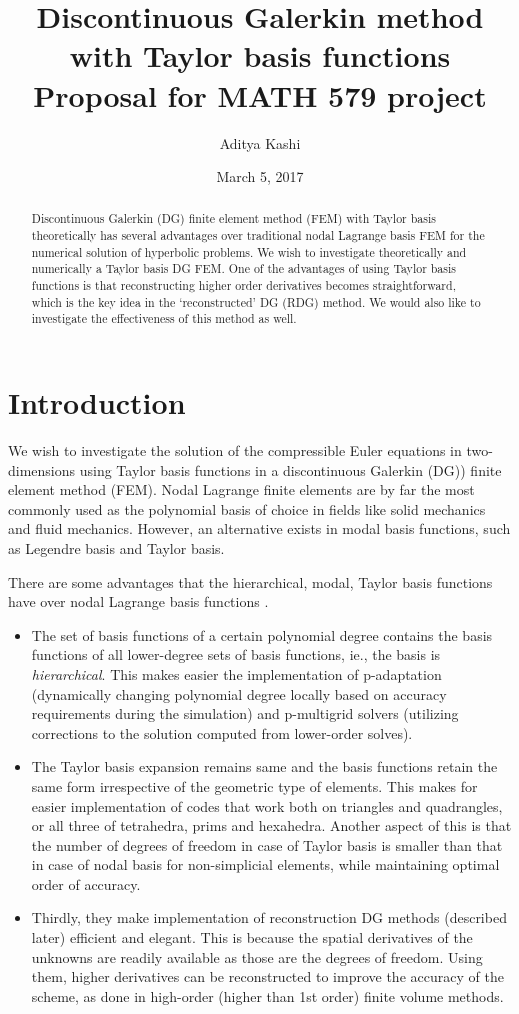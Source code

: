 \documentclass[11pt]{article}
\title{Discontinuous Galerkin method with Taylor basis functions \\
\large Proposal for MATH 579 project}
\author{Aditya Kashi}
\date{March 5, 2017}
\begin{document}
\maketitle
\begin{abstract}
Discontinuous Galerkin (DG) finite element method (FEM) with Taylor basis theoretically has several advantages over traditional nodal Lagrange basis FEM for the numerical solution of hyperbolic problems. We wish to investigate theoretically and numerically a Taylor basis DG FEM. One of the advantages of using Taylor basis functions is that reconstructing higher order derivatives becomes straightforward, which is the key idea in the `reconstructed' DG (RDG) method. We would also like to investigate the effectiveness of this method as well.
\end{abstract}

\section{Introduction}
We wish to investigate the solution of the compressible Euler equations in two-dimensions using Taylor basis functions in a discontinuous Galerkin (DG)) finite element method (FEM). Nodal Lagrange finite elements are by far the most commonly used as the polynomial basis of choice in fields like solid mechanics and fluid mechanics. However, an alternative exists in modal basis functions, such as Legendre basis and Taylor basis.

There are some advantages that the hierarchical, modal, Taylor basis functions have over nodal Lagrange basis functions \cite{luo_taylor, aizinger_scaleseparation}. 
\begin{itemize}
\item The set of basis functions of a certain polynomial degree contains the basis functions of all lower-degree sets of basis functions, ie., the basis is \emph{hierarchical}. This makes easier the implementation of p-adaptation (dynamically changing polynomial degree locally based on accuracy requirements during the simulation) and p-multigrid solvers (utilizing corrections to the solution computed from lower-order solves).
\item The Taylor basis expansion remains same and the basis functions retain the same form irrespective of the geometric type of elements. This makes for easier implementation of codes that work both on triangles and quadrangles, or all three of tetrahedra, prims and hexahedra. Another aspect of this is that the number of degrees of freedom in case of Taylor basis is smaller than that in case of nodal basis for non-simplicial elements, while maintaining optimal order of accuracy.
\item Thirdly, they make implementation of reconstruction DG methods (described later) efficient and elegant. This is because the spatial derivatives of the unknowns are readily available as those are the degrees of freedom. Using them, higher derivatives can be reconstructed to improve the accuracy of the scheme, as done in high-order (higher than 1st order) finite volume methods.
\end{itemize}
\end{document}
